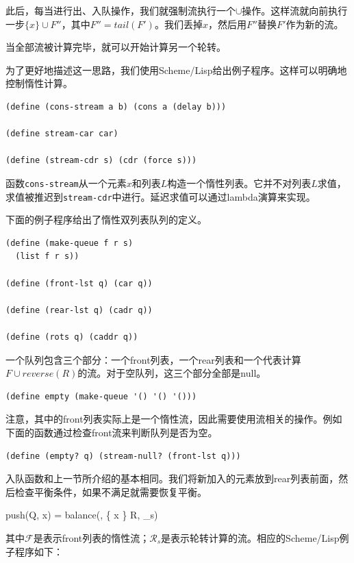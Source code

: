 \documentclass[b5paper]{ctexart}
\begin{document}
此后，每当进行出、入队操作，我们就强制流执行一个$\cup$操作。这样流就向前执行一步$ \{ x \} \cup F''$，其中$F'' = tail(F')$。我们丢掉$x$，然后用$F''$替换$F'$作为新的流。

当全部流被计算完毕，就可以开始计算另一个轮转。

为了更好地描述这一思路，我们使用Scheme/Lisp给出例子程序。这样可以明确地控制惰性计算。

\lstset{language=Lisp}
\begin{lstlisting}
(define (cons-stream a b) (cons a (delay b)))

(define stream-car car)

(define (stream-cdr s) (cdr (force s)))
\end{lstlisting}

函数\texttt{cons-stream}从一个元素$x$和列表$L$构造一个惰性列表。它并不对列表$L$求值，求值被推迟到\texttt{stream-cdr}中进行。延迟求值可以通过lambda演算来实现\cite{SICP}。

下面的例子程序给出了惰性双列表队列的定义。

\lstset{language=Lisp}
\begin{lstlisting}
(define (make-queue f r s)
  (list f r s))

(define (front-lst q) (car q))

(define (rear-lst q) (cadr q))

(define (rots q) (caddr q))
\end{lstlisting}

一个队列包含三个部分：一个front列表，一个rear列表和一个代表计算$F \cup reverse(R)$的流。对于空队列，这三个部分全部是null。

\begin{lstlisting}
(define empty (make-queue '() '() '()))
\end{lstlisting}

注意，其中的front列表实际上是一个惰性流，因此需要使用流相关的操作。例如下面的函数通过检查front流来判断队列是否为空。

\begin{lstlisting}
(define (empty? q) (stream-null? (front-lst q)))
\end{lstlisting}

入队函数和上一节所介绍的基本相同。我们将新加入的元素放到rear列表前面，然后检查平衡条件，如果不满足就需要恢复平衡。

\be
push(Q, x) = balance(, \{ x \} \cup R, _s)
\ee

其中$\mathcal{F}$是表示front列表的惰性流；$\mathcal{R}_s$是表示轮转计算的流。相应的Scheme/Lisp例子程序如下：
\end{document}
